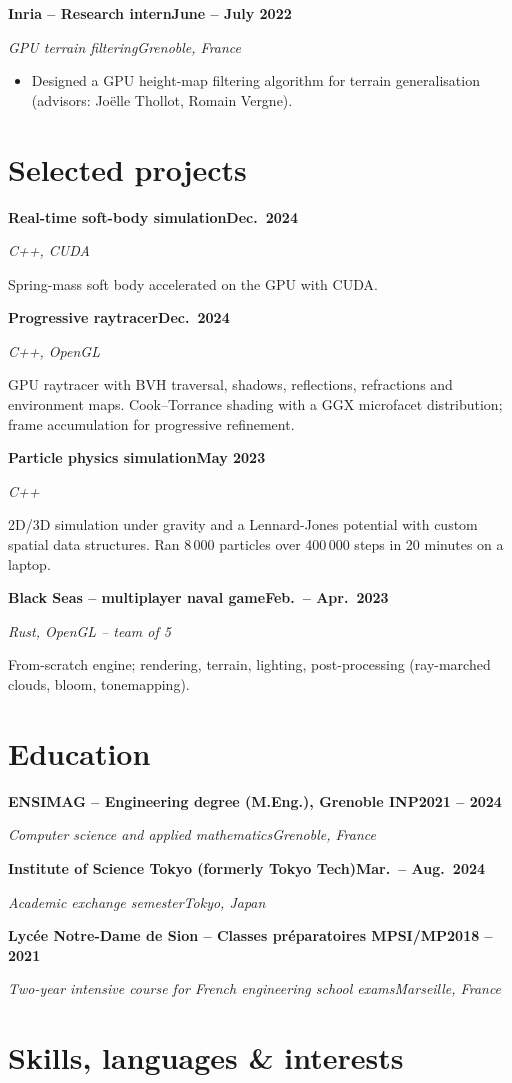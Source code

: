 \documentclass[10pt,a4paper]{article}
\newcommand{\role}[4]{%
  \vspace{3pt}%
  \textbf{#1}\hfill\textbf{#3}\par
  {\color{muted}\textit{#2}\hfill\textit{#4}}\par
}
\newenvironment{tasks}
  {\begin{itemize}[leftmargin=14pt,itemsep=1pt,parsep=1pt,topsep=2pt,label={\color{accent}\textbullet}]}
  {\end{itemize}}
\begin{document}
\role{Inria -- Research intern}{GPU terrain filtering}{June -- July 2022}{Grenoble, France}
\begin{tasks}
\item Designed a GPU height-map filtering algorithm for terrain generalisation (advisors: Joëlle Thollot, Romain Vergne).
\end{tasks}

\section{Selected projects}

\role{Real-time soft-body simulation}{C++, CUDA}{Dec.\ 2024}{}
Spring-mass soft body accelerated on the GPU with CUDA.

\role{Progressive raytracer}{C++, OpenGL}{Dec.\ 2024}{}
GPU raytracer with BVH traversal, shadows, reflections, refractions and environment maps. Cook--Torrance shading with a GGX microfacet distribution; frame accumulation for progressive refinement.

\role{Particle physics simulation}{C++}{May 2023}{}
2D/3D simulation under gravity and a Lennard-Jones potential with custom spatial data structures. Ran 8\,000 particles over 400\,000 steps in 20 minutes on a laptop.

\role{Black Seas -- multiplayer naval game}{Rust, OpenGL -- team of 5}{Feb.\ -- Apr.\ 2023}{}
From-scratch engine; rendering, terrain, lighting, post-processing (ray-marched clouds, bloom, tonemapping).

\section{Education}

\role{ENSIMAG -- Engineering degree (M.Eng.), Grenoble INP}{Computer science and applied mathematics}{2021 -- 2024}{Grenoble, France}

\role{Institute of Science Tokyo (formerly Tokyo Tech)}{Academic exchange semester}{Mar.\ -- Aug.\ 2024}{Tokyo, Japan}

\role{Lycée Notre-Dame de Sion -- Classes préparatoires MPSI/MP}{Two-year intensive course for French engineering school exams}{2018 -- 2021}{Marseille, France}

\section{Skills, languages \& interests}
\end{document}
